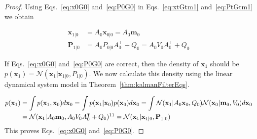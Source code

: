 \begin{proof}
	Using Eqs.~\ref{eq:x0G0} and~\ref{eq:P0G0} in Eqs.~\ref{eq:xtGtm1} and~\ref{eq:PtGtm1} we obtain

    \begin{align*}
        \mathbf{x}_{1|0}&=A_0\mathbf{x}_{0|0}=A_0\mathbf{m}_0\\
        \mathbf{P}_{1|0}&=A_0P_{0|0}A_0^\intercal+Q_0=A_0V_0A_0^\intercal+Q_0
    \end{align*}

	If Eqs.~\ref{eq:x0G0} and~\ref{eq:P0G0} are correct, then the density of $\mathbf{x}_1$ should be $p(\mathbf{x}_1)=\mathcal{N}(\mathbf{x}_1|\mathbf{x}_{1|0},P_{1|0})$. We now calculate this density using the linear dynamical system model in Theorem~\ref{thm:kalmanFilterEqs}.

    \begin{align}
		p(\mathbf{x}_1)&=\int p(\mathbf{x}_1,\mathbf{x}_0)d\mathbf{x}_0=\int p(\mathbf{x}_1|\mathbf{x}_0)p(\mathbf{x}_0)d\mathbf{x}_0=\int\mathcal{N}(\mathbf{x}_1|A_0\mathbf{x}_0,Q_0)\mathcal{N}(\mathbf{x}_0|\mathbf{m}_0,V_0)d\mathbf{x}_0\nonumber\\
                       &=\mathcal{N}(\mathbf{x}_1|A_0\mathbf{m}_0,A_0V_0A_0^\intercal+Q_0)\footnotemark[11]=\mathcal{N}(\mathbf{x}_1|\mathbf{x}_{1|0},\mathbf{P}_{1|0})\nonumber
    \end{align}
	This proves Eqs.~\ref{eq:x0G0} and~\ref{eq:P0G0}.

\end{proof}

\pagebreak



\pagebreak



\pagebreak


